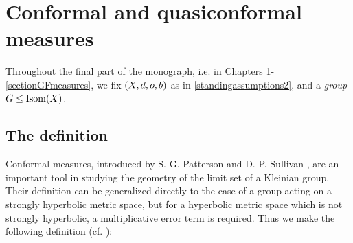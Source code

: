 %


\chapter{Conformal and quasiconformal measures}\label{sectionconformal}

\begin{standingassumption*}
\label{}
Throughout the final part of the monograph, i.e. in Chapters \ref{sectionconformal}-\ref{sectionGFmeasures},  we fix $(X,d,o,b)$ as in \6\ref{standingassumptions2}, and a \emph{group} $G\leq\operatorname{Isom}(X)$.
\end{standingassumption*}

\section{The definition}
Conformal measures, introduced by S. G. Patterson \cite{Patterson2} and D. P. Sullivan \cite{Sullivan_density_at_infinity}, are an important tool in studying the geometry of the limit set of a Kleinian group. Their definition can be generalized directly to the case of a group acting on a strongly hyperbolic metric space, but for a hyperbolic metric space which is not strongly hyperbolic, a multiplicative error term is required. Thus we make the following definition (cf. \cite[Definition 4.1]{Coornaert}):

